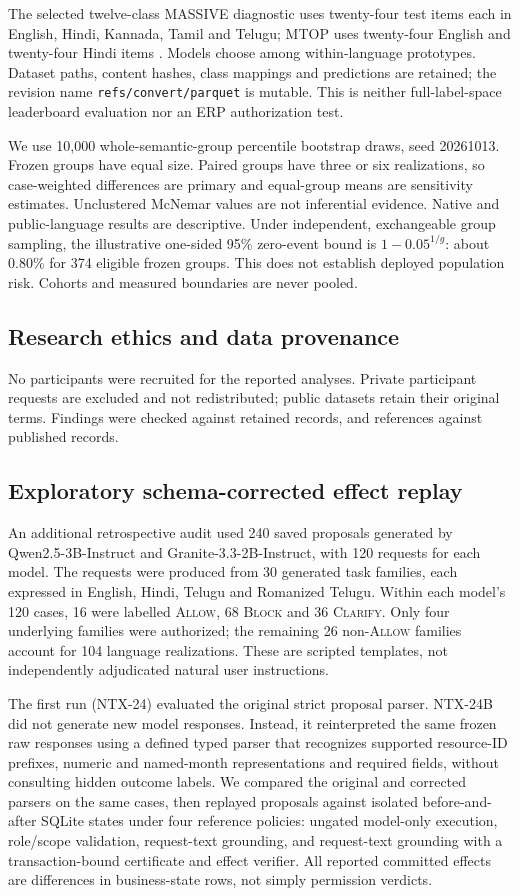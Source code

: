 \documentclass[pdflatex,sn-nature]{sn-jnl}
\newcommand{\allow}{\textsc{Allow}\xspace}
\newcommand{\block}{\textsc{Block}\xspace}
\newcommand{\clarify}{\textsc{Clarify}\xspace}
\begin{document}
The selected twelve-class MASSIVE diagnostic uses twenty-four test items each in English, Hindi, Kannada, Tamil and Telugu; MTOP uses twenty-four English and twenty-four Hindi items \cite{massive2023,mtop2021}. Models choose among within-language prototypes. Dataset paths, content hashes, class mappings and predictions are retained; the revision name \texttt{refs/convert/parquet} is mutable. This is neither full-label-space leaderboard evaluation nor an ERP authorization test.

We use 10,000 whole-semantic-group percentile bootstrap draws, seed 20261013. Frozen groups have equal size. Paired groups have three or six realizations, so case-weighted differences are primary and equal-group means are sensitivity estimates. Unclustered McNemar values are not inferential evidence. Native and public-language results are descriptive. Under independent, exchangeable group sampling, the illustrative one-sided 95\% zero-event bound is $1-0.05^{1/g}$: about 0.80\% for 374 eligible frozen groups. This does not establish deployed population risk. Cohorts and measured boundaries are never pooled.

\subsection{Research ethics and data provenance}
No participants were recruited for the reported analyses. Private participant requests are excluded and not redistributed; public datasets retain their original terms. Findings were checked against retained records, and references against published records.
\subsection{Exploratory schema-corrected effect replay}
An additional retrospective audit used 240 saved proposals generated by Qwen2.5-3B-Instruct and Granite-3.3-2B-Instruct, with 120 requests for each model. The requests were produced from 30 generated task families, each expressed in English, Hindi, Telugu and Romanized Telugu. Within each model's 120 cases, 16 were labelled \allow, 68 \block and 36 \clarify. Only four underlying families were authorized; the remaining 26 non-\allow families account for 104 language realizations. These are scripted templates, not independently adjudicated natural user instructions.

The first run (NTX-24) evaluated the original strict proposal parser. NTX-24B did not generate new model responses. Instead, it reinterpreted the same frozen raw responses using a defined typed parser that recognizes supported resource-ID prefixes, numeric and named-month representations and required fields, without consulting hidden outcome labels. We compared the original and corrected parsers on the same cases, then replayed proposals against isolated before-and-after SQLite states under four reference policies: ungated model-only execution, role/scope validation, request-text grounding, and request-text grounding with a transaction-bound certificate and effect verifier. All reported committed effects are differences in business-state rows, not simply permission verdicts.
\end{document}
